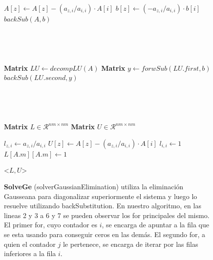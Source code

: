 \newpage
\begin{figure}[!htb]
\centering
{}
  
  \begin{algorithmic}[1]
      \For{$i \in [1, A.m)$}
	   \State $A[z] \leftarrow A[z] - (a_{z,i}/a_{i,i})\cdot A[i]$
	   \State $b[z] \leftarrow (-a_{z,i}/a_{i,i})\cdot b[i]$
	\EndFor
      \EndFor
      \State \Return $backSub(A,b)$
    \EndFunction
  \end{algorithmic} 
  
  ~
  
  ~
  
  \begin{algorithmic}[1] 
      \State \textbf{Matrix} $LU \leftarrow decompLU(A)$
      \State \textbf{Matrix} $y \leftarrow forwSub(LU.first,b)$
      \State \Return $backSub(LU.second,y)$
    \EndFunction
  \end{algorithmic}
  
  ~
  
  ~
  
  \begin{algorithmic}[1]
      \State \textbf{Matrix} $L \in \mathcal{R}^{nm\times nm}$
      \State \textbf{Matrix} $U \in \mathcal{R}^{nm\times nm}$
      
      \For{$i \in [1, A.m)$}
	    \State $l_{z,i} \leftarrow a_{z,i}/a_{i,i}$
	    \State $U[z] \leftarrow A[z] - (a_{z,i}/a_{i,i})\cdot A[i]$
	\EndFor
	\State $l_{i,i} \leftarrow 1$
      \EndFor
      \State $L[A.m][A.m] \leftarrow 1$
      
      \State \Return <$L,U$>
    \EndFunction
  \end{algorithmic} 
  
\endminipage\hfill
{}
\endminipage\hfill
{}

\textbf{SolveGe} (solverGaussianElimination) utiliza la eliminaci\'on Gausseana para diagonalizar superiormente el sistema y luego lo resuelve utilizando backSubstitution. En nuestro algoritmo, en las lineas 2 y 3 a 6 y 7 se pueden observar los for principales del mismo. El primer for, cuyo contador es $i$, se encarga de apuntar a la fila que se esta usando para conseguir ceros en las dem\'as. El segundo for, a quien el contador $j$ le pertenece, se encarga de iterar por las filas inferiores a la fila $i$. 


\end{figure}

